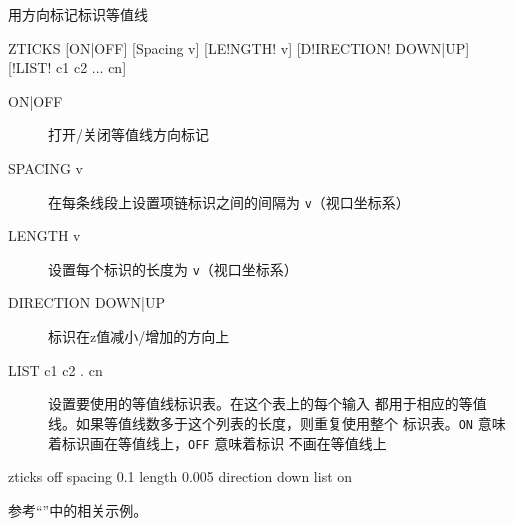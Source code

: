 \label{cmd:zticks}

用方向标记标识等值线

\begin{SACSTX}
ZTICKS [ON|OFF] [Spacing v] [LE!NGTH! v] [D!IRECTION! DOWN|UP]
    [!LIST! c1 c2 ... cn]
\end{SACSTX}

\begin{description}
\item [ON|OFF] 打开/关闭等值线方向标记
\item [SPACING v] 在每条线段上设置项链标识之间的间隔为 \texttt{v}（视口坐标系）
\item [LENGTH v] 设置每个标识的长度为 \texttt{v}（视口坐标系）
\item [DIRECTION DOWN|UP] 标识在z值减小/增加的方向上
\item [LIST c1 c2 . cn] 设置要使用的等值线标识表。在这个表上的每个输入
    都用于相应的等值线。如果等值线数多于这个列表的长度，则重复使用整个
    标识表。\texttt{ON} 意味着标识画在等值线上，\texttt{OFF} 意味着标识
    不画在等值线上
\end{description}

\begin{SACDFT}
zticks off spacing 0.1 length 0.005 direction down list on
\end{SACDFT}

参考``''中的相关示例。
